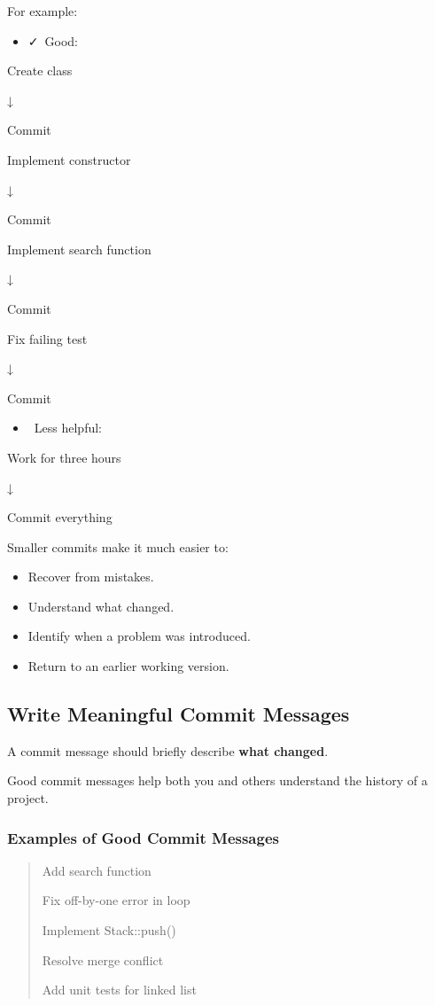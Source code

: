 \documentclass{csc2059practical}
\begin{document}
For example:

\begin{itemize}
  \item \faCheck\ Good:
\end{itemize}
Create class

↓

Commit

Implement constructor

↓

Commit

Implement search function

↓

Commit

Fix failing test

↓

Commit

\begin{itemize}
  \item \faTimes\ Less helpful:
\end{itemize}
Work for three hours

↓

Commit everything

Smaller commits make it much easier to:

\begin{itemize}
  \item Recover from mistakes.
  \item Understand what changed.
  \item Identify when a problem was introduced.
  \item Return to an earlier working version.
\end{itemize}
\subsection{Write Meaningful Commit Messages}
A commit message should briefly describe \textbf{what changed}.

Good commit messages help both you and others understand the history of a project.

\subsubsection{Examples of Good Commit Messages}
\begin{quote}
  Add search function
  
  Fix off-by-one error in loop
  
  Implement Stack::push()
  
  Resolve merge conflict
  
  Add unit tests for linked list
\end{quote}
\end{document}
